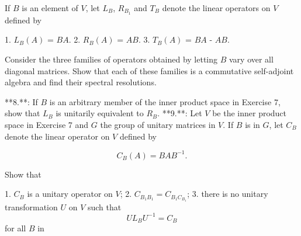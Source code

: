 If \(B\) is an element of \(V\), let \(L_{B}\), \(R_{B_{1}}\) and \(T_{B}\) denote the linear operators on \(V\) defined by

1. \(L_{B}(A)\) = \(BA\).
2. \(R_{B}(A)\) = \(AB\).
3. \(T_{B}(A)\) = \(BA\) - \(AB\).

Consider the three families of operators obtained by letting \(B\) vary over all diagonal matrices. Show that each of these families is a commutative self-adjoint algebra and find their spectral resolutions.

**8.**: If \(B\) is an arbitrary member of the inner product space in Exercise 7, show that \(L_{B}\) is unitarily equivalent to \(R_{B}\).
**9.**: Let \(V\) be the inner product space in Exercise 7 and \(G\) the group of unitary matrices in \(V\). If \(B\) is in \(G\), let \(C_{B}\) denote the linear operator on \(V\) defined by

\[C_{B}(A)=BAB^{-1}.\]

Show that

1. \(C_{B}\) is a unitary operator on \(V\);
2. \(C_{B_{1}B_{1}}=C_{B_{1}C_{B_{1}}}\);
3. there is no unitary transformation \(U\) on \(V\) such that \[UL_{B}U^{-1}=C_{B}\] for all \(B\) in 
